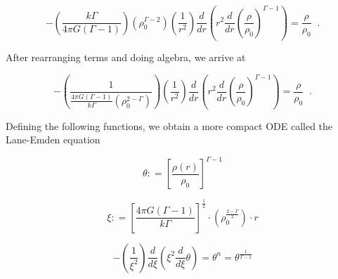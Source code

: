\begin{equation}
-\left( \frac{k \Gamma}{4\pi G(\Gamma-1)} \right)\left( \rho_0^{\Gamma-2} \right) \left(\frac{1}{r^2}\right) \frac{d}{dr} \left(r^2 {\frac{d}{dr}\left(\frac{\rho}{\rho_0}\right)}^{\Gamma-1} \right) =  \frac{\rho}{\rho_0}\;\;.
\end{equation}

After rearranging terms and doing algebra, we arrive at

%
%

\begin{equation}\label{pre.lane-emden}
-\left( \frac{1}{\frac{4\pi G(\Gamma-1)}{k \Gamma }\left( \rho_0^{2-\Gamma} \right)} \right) \left(\frac{1}{r^2}\right) \frac{d}{dr} \left(r^2 {\frac{d}{dr}\left(\frac{\rho}{\rho_0}\right)}^{\Gamma-1} \right) =  \frac{\rho}{\rho_0}\;\; .
\end{equation}

Defining the following functions, we obtain a more compact ODE called the Lane-Emden equation

\begin{equation}\label{lane-emden0}
\theta : = \left[ \frac{\rho(r)}{\rho_0} \right]^{\Gamma -1} 
\end{equation}

\begin{equation}\label{lane-emden1}
\xi : = \left[ \frac{4\pi G (\Gamma-1)}{k \Gamma} \right]^{\frac{1}{2}} \cdot \left( \rho_0^{\frac{2-\Gamma}{2}} \right) \cdot r
\end{equation}

\begin{equation}\label{LE}
- \left(\frac{1}{\xi^2}\right) \frac{d}{d\xi} \left(\xi^2 \frac{d}{d\xi} \theta \right) = \theta^n =  \theta^{\frac{1}{\Gamma-1}}
\end{equation}


